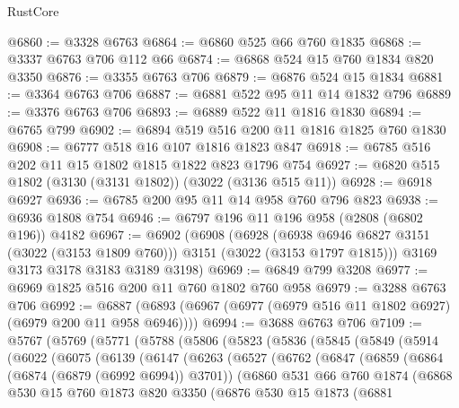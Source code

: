 \begin{lexlean}{RustCore}
\begin{coremodule}
@6860 := @3328 @6763
@6864 := @6860 @525 @66 @760 @1835
@6868 := @3337 @6763 @706 @112 @66
@6874 := @6868 @524 @15 @760 @1834 @820 @3350
@6876 := @3355 @6763 @706
@6879 := @6876 @524 @15 @1834
@6881 := @3364 @6763 @706
@6887 := @6881 @522 @95 @11 @14 @1832 @796
@6889 := @3376 @6763 @706
@6893 := @6889 @522 @11 @1816 @1830
@6894 := @6765 @799
@6902 := @6894 @519 @516 @200 @11 @1816 @1825 @760 @1830
@6908 := @6777 @518 @16 @107 @1816 @1823 @847
@6918 := @6785 @516 @202 @11 @15 @1802 @1815 @1822 @823 @1796 @754
@6927 := @6820 @515 @1802 (@3130 (@3131 @1802)) (@3022 (@3136 @515 @11))
@6928 := @6918 @6927
@6936 := @6785 @200 @95 @11 @14 @958 @760 @796 @823
@6938 := @6936 @1808 @754
@6946 := @6797 @196 @11 @196 @958 (@2808 (@6802 @196)) @4182
@6967 := @6902
    (@6908
      (@6928 (@6938 @6946 @6827 @3151 (@3022 (@3153 @1809 @760))) @3151 (@3022 (@3153 @1797 @1815)))
      @3169
      @3173
      @3178
      @3183
      @3189
      @3198)
@6969 := @6849 @799 @3208
@6977 := @6969 @1825 @516 @200 @11 @760 @1802 @760 @958
@6979 := @3288 @6763 @706
@6992 := @6887 (@6893 (@6967 (@6977 (@6979 @516 @11 @1802 @6927) (@6979 @200 @11 @958 @6946))))
@6994 := @3688 @6763 @706
@7109 := @5767
    (@5769
      (@5771
        (@5788
          (@5806
            (@5823
              (@5836
                (@5845
                  (@5849
                    (@5914
                      (@6022
                        (@6075
                          (@6139
                            (@6147
                              (@6263
                                (@6527
                                  (@6762
                                    (@6847
                                      (@6859
                                        (@6864 (@6874 (@6879 (@6992 @6994)) @3701))
                                        (@6860
                                          @531
                                          @66
                                          @760
                                          @1874
                                          (@6868
                                            @530
                                            @15
                                            @760
                                            @1873
                                            @820
                                            @3350
                                            (@6876
                                              @530
                                              @15
                                              @1873
                                              (@6881

\end{coremodule}
\end{lexlean}
